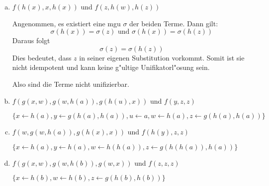 \documentclass[10pt, oneside]{article}
\begin{document}
\begin{enumerate}[(a)]
    \item $f(h(x), x, h(x))$ und $f(z, h(w), h(z))$

        Angenommen, es existiert eine mgu $\sigma$ der beiden Terme. Dann gilt:
        \begin{equation*}
            \sigma(h(x)) = \sigma(z) \text{ und } \sigma(h(x)) = \sigma(h(z))
        \end{equation*}
        Daraus folgt
        \begin{equation*}
            \sigma(z) = \sigma(h(z))
        \end{equation*}
        Dies bedeutet, dass $z$ in seiner eigenen Substitution vorkommt. Somit
        ist sie nicht idempotent und kann keine g"ultige Unifikatorl"osung
        sein.

        Also sind die Terme nicht unifizierbar.

    \item $f(g(x, w), g(w, h(a)), g(h(u), x))$ und $f(y, z, z)$

        $\{ x \leftarrow h(a), y \leftarrow g(h(a), h(a)), u \leftarrow a, w \leftarrow h(a), z \leftarrow g(h(a), h(a))\}$

    \item $f(w, g(w, h(a)), g(h(x), x))$ und $f(h(y), z, z)$

        $\{ x \leftarrow h(a), y \leftarrow h(a), w \leftarrow h(h(a)), z \leftarrow g(h(h(a)), h(a)) \}$

    \item $f(g(x, w), g(w, h(b)), g(w, x))$ und $f(z, z, z)$

        $\{ x \leftarrow h(b), w \leftarrow h(b), z \leftarrow g(h(b), h(b)) \}$
\end{enumerate}
\end{document}
